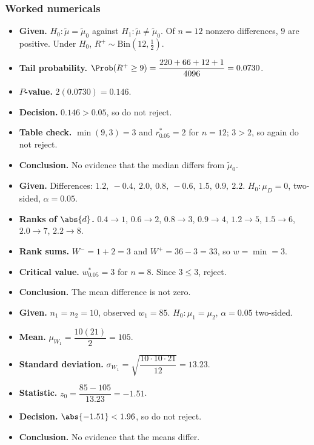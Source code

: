 \subsubsection*{Worked numericals}

\begin{example}
\begin{itemize}
  \item \textbf{Given.} $H_0:\tilde\mu=\tilde\mu_0$ against $H_1:\tilde\mu\ne\tilde\mu_0$. Of $n=12$ nonzero differences, $9$ are positive. Under $H_0$, $R^+\sim\mathrm{Bin}(12,\tfrac12)$.
  \item \textbf{Tail probability.} $\Prob(R^+\ge9)=\dfrac{220+66+12+1}{4096}=0.0730$.
  \item \textbf{$P$-value.} $2(0.0730)=0.146$.
  \item \textbf{Decision.} $0.146>0.05$, so do not reject.
  \item \textbf{Table check.} $\min(9,3)=3$ and $r^*_{0.05}=2$ for $n=12$; $3>2$, so again do not reject.
  \item \textbf{Conclusion.} No evidence that the median differs from $\tilde\mu_0$.
\end{itemize}
\end{example}

\begin{example}
\begin{itemize}
  \item \textbf{Given.} Differences: $1.2,\ -0.4,\ 2.0,\ 0.8,\ -0.6,\ 1.5,\ 0.9,\ 2.2$. $H_0:\mu_D=0$, two-sided, $\alpha=0.05$.
  \item \textbf{Ranks of $\abs{d}$.} $0.4\to1$, $0.6\to2$, $0.8\to3$, $0.9\to4$, $1.2\to5$, $1.5\to6$, $2.0\to7$, $2.2\to8$.
  \item \textbf{Rank sums.} $W^-=1+2=3$ and $W^+=36-3=33$, so $w=\min=3$.
  \item \textbf{Critical value.} $w^*_{0.05}=3$ for $n=8$. Since $3\le3$, reject.
  \item \textbf{Conclusion.} The mean difference is not zero.
\end{itemize}
\end{example}

\begin{example}
\begin{itemize}
  \item \textbf{Given.} $n_1=n_2=10$, observed $w_1=85$. $H_0:\mu_1=\mu_2$, $\alpha=0.05$ two-sided.
  \item \textbf{Mean.} $\mu_{W_1}=\dfrac{10(21)}{2}=105$.
  \item \textbf{Standard deviation.} $\sigma_{W_1}=\sqrt{\dfrac{10\cdot10\cdot21}{12}}=13.23$.
  \item \textbf{Statistic.} $z_0=\dfrac{85-105}{13.23}=-1.51$.
  \item \textbf{Decision.} $\abs{-1.51}<1.96$, so do not reject.
  \item \textbf{Conclusion.} No evidence that the means differ.
\end{itemize}
\end{example}

